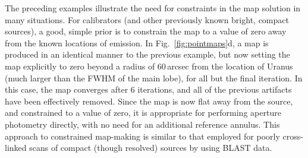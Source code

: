 \documentclass[useAMS,usenatbib,nofootinbib]{mn2e}
\begin{document}
The preceding examples illustrate the need for constraints in the map
solution in many situations. For calibrators (and other previously
known bright, compact sources), a good, simple prior is to constrain
the map to a value of zero away from the known locations of
emission. In Fig.~\ref{fig:pointmaps}d, a map is produced in an
identical manner to the previous example, but now setting the map
explicitly to zero beyond a radius of 60\,arcsec from the location of
Uranus (much larger than the FWHM of the main lobe), for all but the
final iteration. In this case, the map converges after 6 iterations,
and all of the previous artifacts have been effectively removed. Since
the map is now flat away from the source, and constrained to a value
of zero, it is appropriate for performing aperture photometry
directly, with no need for an additional reference annulus. This
approach to constrained map-making is similar to that employed for
poorly cross-linked scans of compact (though resolved) sources by
\citet{wiebe2009} using BLAST data.
\end{document}
